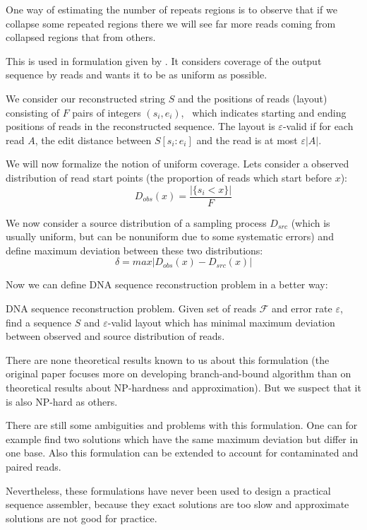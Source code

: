 \bigskip

One way of estimating the number of repeats regions is to observe
that if we collapse some repeated regions there we will see far
more reads coming from collapsed regions that from others. 

This is used in formulation given by \citet{myers1995toward}. It considers
coverage of the output sequence by reads and wants it to be as uniform as possible.

We consider our reconstructed string $S$ and the positions of reads (layout)
consisting of $F$ pairs of integers $(s_i, e_i)$,
\ which indicates starting and ending positions
of reads in the reconstructed sequence. The layout is $\varepsilon$-valid
if for each read $A$, the edit distance between $S[s_i:e_i]$ and the read
is at most $\varepsilon |A|$.

We will now formalize the notion of uniform coverage. Lets consider a observed
distribution of read start points (the proportion of reads which start before $x$):
$$D_{obs}(x) = \frac{|\{s_i < x\}|}{F}$$

We now consider a source distribution of a sampling process $D_{src}$ (which is usually
uniform, but can be nonuniform due to some systematic errors) and define maximum
deviation between these two distributions:
$$\delta = max |D_{obs}(x) - D_{src}(x)|$$

Now we can define DNA sequence reconstruction problem in a better way:

\begin{definition}{DNA sequence reconstruction problem.}
Given set of reads $\mathcal{F}$ and error rate $\varepsilon$, find
a sequence $S$ and $\varepsilon$-valid layout which has minimal
maximum deviation between observed and source distribution of reads.
\end{definition}

There are none theoretical results known to us about this formulation
(the original paper focuses more on developing branch-and-bound algorithm
than on theoretical results about NP-hardness and approximation).
But we suspect that it is also NP-hard as others.

There are still some ambiguities and problems with this formulation.
One can for example find two solutions which have the same maximum deviation
but differ in one base.
Also this formulation can be extended to account for contaminated and paired
reads.

Nevertheless, these formulations have never been used to design
a practical sequence assembler, because they exact solutions are too slow
and approximate solutions are not good for practice.

